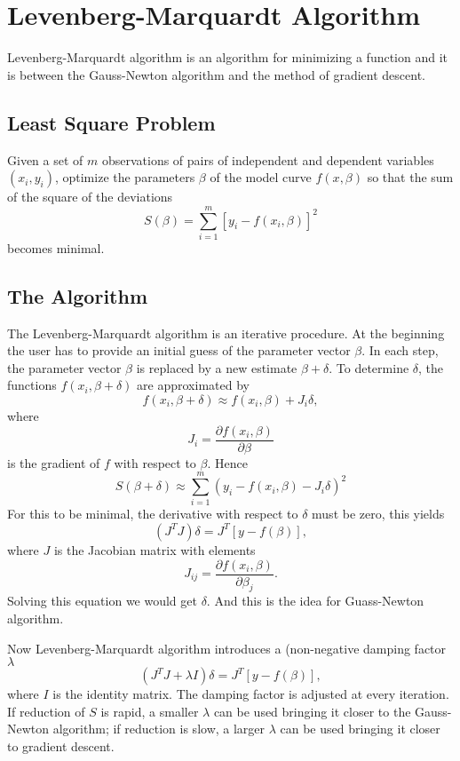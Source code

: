 \chapter{Levenberg-Marquardt Algorithm} \label{C:levenberg}

Levenberg-Marquardt algorithm is an algorithm for minimizing a function and it
is between the Gauss-Newton algorithm and the method of gradient descent.

\section{Least Square Problem}
Given a set of $m$ observations of pairs of independent and dependent variables
$(x_i,y_i)$, optimize the parameters $\beta$ of the model curve $f(x,\beta)$ so
that the sum of the square of the deviations
\[
  S(\beta) = \sum_{i=1}^m [y_i - f(x_i,\beta)]^2
\]
becomes minimal.

\section{The Algorithm}
The Levenberg-Marquardt algorithm is an iterative procedure. At the beginning
the user has to provide an initial guess of the parameter vector $\beta$. In
each step, the parameter vector $\beta$ is replaced by a new estimate
$\beta+\delta$. To determine $\delta$, the functions $f(x_i,\beta+\delta)$ are
approximated by
\[
  f(x_i,\beta+\delta) \approx f(x_i,\beta) + J_i \delta, 
\]
where
\[
  J_i = \frac{\partial f(x_i,\beta)}{\partial \beta}
\]
is the gradient of $f$ with respect to $\beta$. Hence 
\[
  S(\beta+\delta) \approx \sum_{i=1}^m (y_i - f(x_i,\beta)-J_i\delta)^2
\]
For this to be minimal, the derivative with respect to $\delta$ must be zero,
this yields
\[
  (J^T J) \delta = J^T [y-f(\beta)],
\]
where $J$ is the Jacobian matrix with elements
\[
  J_{ij} = \frac{\partial f(x_i,\beta)}{\partial \beta_j}.
\]
Solving this equation we would get $\delta$. And this is the idea for
Guass-Newton algorithm.

Now Levenberg-Marquardt algorithm introduces a (non-negative damping factor
$\lambda$
\[
  (J^T J + \lambda I) \delta = J^T [y-f(\beta)],
\]
where $I$ is the identity matrix.
The damping factor is adjusted at every iteration. If reduction of $S$ is rapid,
a smaller $\lambda$ can be used bringing it closer to the Gauss-Newton
algorithm; if reduction is slow, a larger $\lambda$ can be used bringing it
closer to gradient descent.

